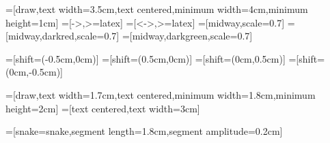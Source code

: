 =[draw,text width=3.5cm,text centered,minimum width=4cm,minimum height=1cm]
=[->,>=latex]
=[<->,>=latex]
=[midway,scale=0.7]
=[midway,darkred,scale=0.7]
=[midway,darkgreen,scale=0.7]

=[shift={(-0.5cm,0cm)}]
=[shift={(0.5cm,0cm)}]
=[shift={(0cm,0.5cm)}]
=[shift={(0cm,-0.5cm)}]

=[draw,text width=1.7cm,text centered,minimum width=1.8cm,minimum height=2cm]
=[text centered,text width=3cm]

=[snake=snake,segment length=1.8cm,segment amplitude=0.2cm]

